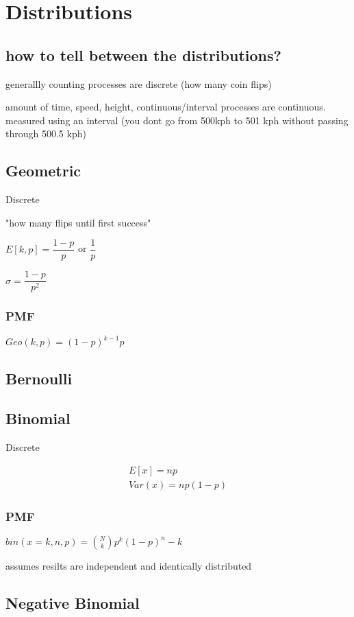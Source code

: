 \documentclass[12pt,fleqn]{article}
\begin{document}
\section{Distributions}
\subsection{how to tell between the distributions?}

generallly counting processes are discrete (how many coin flips)

amount of time, speed, height, continuous/interval processes are continuous. measured using an interval (you dont go from 500kph to 501 kph without passing through 500.5 kph)



\subsection{Geometric}
Discrete

"how many flips until first success"

$E[k, p] = \dfrac{1-p}{p}$ or $\dfrac{1}{p}$

$\sigma = \dfrac{1-p}{p^2}$

\subsubsection{PMF}
$Geo(k, p) = (1-p)^{k-1}p$

\subsection{Bernoulli}
\subsection{Binomial}
Discrete

\begin{align*}
	E[x] = np\\
	Var(x) = np(1-p)
\end{align*}

\subsubsection{PMF}
$bin(x=k,n,p) = {N\choose k} p^k(1-p)^n-k$

assumes resilts are independent and identically distributed


\subsection{Negative Binomial}
\end{document}
